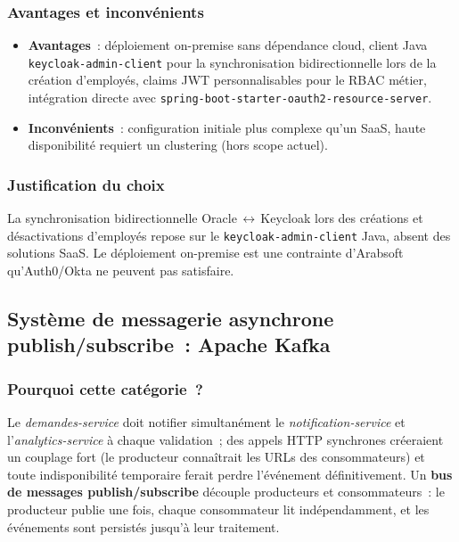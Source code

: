 \subsubsection*{Avantages et inconvénients}

\begin{itemize}[leftmargin=*,nosep]
  \item \textbf{Avantages}~: déploiement on-premise sans dépendance cloud, client Java
        \texttt{keycloak-admin-client} pour la synchronisation bidirectionnelle lors
        de la création d'employés, claims JWT personnalisables pour le RBAC métier,
        intégration directe avec \texttt{spring-boot-starter-oauth2-resource-server}.
  \item \textbf{Inconvénients}~: configuration initiale plus complexe qu'un SaaS,
        haute disponibilité requiert un clustering (hors scope actuel).
\end{itemize}

\subsubsection*{Justification du choix}

La synchronisation bidirectionnelle Oracle\,$\leftrightarrow$\,Keycloak lors des créations et désactivations d'employés repose sur le \texttt{keycloak-admin-client} Java, absent des solutions SaaS. Le déploiement on-premise est une contrainte d'Arabsoft qu'Auth0/Okta ne peuvent pas satisfaire.

\subsection{Système de messagerie asynchrone publish/subscribe~: Apache Kafka}

\subsubsection*{Pourquoi cette catégorie~?}

Le \textit{demandes-service} doit notifier simultanément le \textit{notification-service} et l'\textit{analytics-service} à chaque validation~; des appels HTTP synchrones créeraient un couplage fort (le producteur connaîtrait les URLs des consommateurs) et toute indisponibilité temporaire ferait perdre l'événement définitivement. Un \textbf{bus de messages publish/subscribe} découple producteurs et consommateurs~: le producteur publie une fois, chaque consommateur lit indépendamment, et les événements sont persistés jusqu'à leur traitement.

